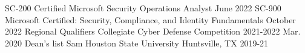 \begin{cvhonors}
  \cvhonor
    {SC-200} %
    {Certified Microsoft Security Operations Analyst} %
    {} %
    {June 2022} %
\cvhonor
    {SC-900} %
    {Microsoft Certified: Security, Compliance, and Identity Fundamentals} %
    {} %
    {October 2022} %
  \cvhonor
    {Regional Qualifiers} %
    {Collegiate Cyber Defense Competition} %
    {2021-2022} %
    {Mar. 2020}
  \cvhonor
    {Dean's list}
    {Sam Houston State University}
    {Huntsville, TX}
    {2019-21}
  
\end{cvhonors}
